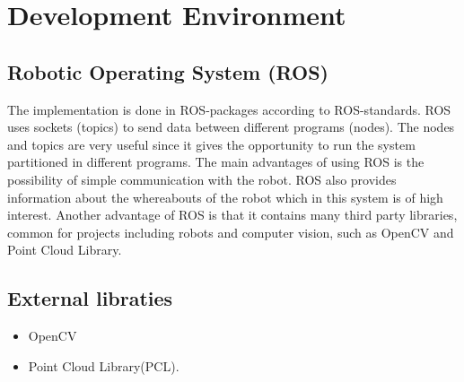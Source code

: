 
\section{Development Environment}

\subsection{Robotic Operating System (ROS)}
The implementation is done in ROS-packages according to ROS-standards. ROS uses sockets (topics) to send data between different programs (nodes). The nodes and topics are very useful since it gives the opportunity to run the system partitioned in different programs. The main advantages of using ROS is the possibility of simple communication with the robot. ROS also provides information about the whereabouts of the robot which in this system is of high interest. Another advantage of ROS is that it contains many third party libraries, common for projects including robots and computer vision, such as OpenCV and Point Cloud Library.  

\subsection{External libraties}
\begin{itemize}
\item OpenCV
\item Point Cloud Library(PCL).
\end{itemize}